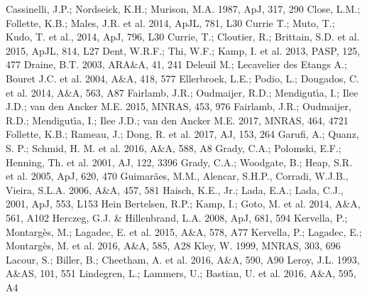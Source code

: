 \documentclass{aa}
\begin{document}
\begin{thebibliography}{}
 Cassinelli, J.P.; Nordseick, K.H.; Murison, M.A. 1987, ApJ, 317, 290
 Close, L.M.; Follette, K.B.; Males, J.R. et al. 2014, ApJL, 781, L30
 Currie T.; Muto, T.; Kudo, T. et al., 2014, ApJ, 796, L30
 Currie, T.; Cloutier, R.; Brittain, S.D. et al. 2015, ApJL, 814, L27
 Dent, W.R.F.; Thi, W.F.; Kamp, I. et al. 2013, PASP, 125, 477 
 Draine, B.T. 2003, ARA\&A, 41, 241
 Deleuil M.; Lecavelier des Etangs A.; Bouret J.C. et al. 2004, A\&A, 418, 577
 Ellerbroek, L.E.; Podio, L.; Dougados, C. et al. 2014, A\&A, 563, A87
 Fairlamb, J.R.; Oudmaijer, R.D.; Mendigut\'\i{}a, I.; Ilee J.D.; van den Ancker M.E. 2015, MNRAS, 453, 976
 Fairlamb, J.R.; Oudmaijer, R.D.; Mendigut\'\i{}a, I.; Ilee J.D.; van den Ancker M.E. 2017, MNRAS, 464, 4721
 Follette, K.B.; Rameau, J.; Dong, R. et al. 2017, AJ, 153, 264
 Garufi, A.; Quanz, S. P.; Schmid, H. M. et al. 2016, A\&A, 588, A8
 Grady, C.A.; Polomski, E.F.; Henning, Th. et al. 2001, AJ, 122, 3396
 Grady, C.A.; Woodgate, B.; Heap, S.R. et al. 2005, ApJ, 620, 470
 Guimar\~{a}es, M.M., Alencar, S.H.P., Corradi, W.J.B., Vieira, S.L.A. 2006, A\&A, 457, 581
 Haisch, K.E., Jr.; Lada, E.A.; Lada, C.J., 2001, ApJ, 553, L153
 Hein Bertelsen, R.P.; Kamp, I.; Goto, M. et al. 2014, A\&A, 561, A102
 Herczeg, G.J. \& Hillenbrand, L.A. 2008, ApJ, 681, 594
 Kervella, P.; Montarg\`es, M.; Lagadec, E. et al. 2015, A\&A, 578, A77
 Kervella, P.; Lagadec, E.; Montarg\`es, M. et al. 2016, A\&A, 585, A28
 Kley, W. 1999, MNRAS, 303, 696
 Lacour, S.; Biller, B.; Cheetham, A. et al. 2016, A\&A, 590, A90
 Leroy, J.L. 1993, A\&AS, 101, 551
 Lindegren, L.; Lammers, U.; Bastian, U. et al. 2016, A\&A, 595, A4

\end{thebibliography}
\end{document}
